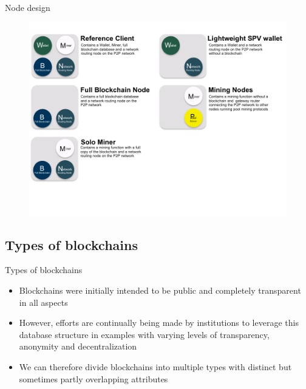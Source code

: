 \documentclass[11pt]{beamer}
\begin{document}
\begin{frame}{Node design}
	\begin{figure}[]
		\centering
		\includegraphics  [scale=0.35]{Images/nodes}
	\end{figure}
\end{frame}


\subsection{Types of blockchains}

\begin{frame}{Types of blockchains}
	\begin{itemize}
		\item Blockchains were initially intended to be public and completely transparent in all aspects
		\item However, efforts are continually being made by institutions to leverage this database structure in examples with varying levels of transparency, anonymity and decentralization
		\item We can therefore divide blockchains into multiple types with distinct but sometimes partly overlapping attributes
	\end{itemize}
\end{frame}

\end{document}
